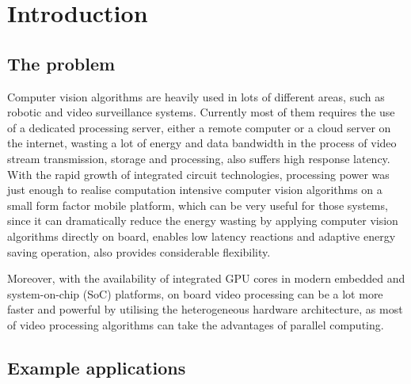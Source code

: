 \chapter{Introduction} \label{Chapter:Introduction}

\iffalse
1-1.5 pages
\fi

\section{The problem}

\iffalse
\fi

Computer vision algorithms are heavily used in lots of different areas, such as robotic and video surveillance systems. Currently most of them requires the use of a dedicated processing server, either a remote computer or a cloud server on the internet, wasting a lot of energy and data bandwidth in the process of video stream transmission, storage and processing, also suffers high response latency. With the rapid growth of integrated circuit technologies, processing power was just enough to realise computation intensive computer vision algorithms on a small form factor mobile platform, which can be very useful for those systems, since it can dramatically reduce the energy wasting by applying computer vision algorithms directly on board, enables low latency reactions and adaptive energy saving operation, also provides considerable flexibility.

Moreover, with the availability of integrated GPU cores in modern embedded and system-on-chip (SoC) platforms, on board video processing can be a lot more faster and powerful by utilising the heterogeneous hardware architecture, as most of video processing algorithms can take the advantages of parallel computing.


\section{Example applications} %

\iffalse
Example applications, can be multiple.
e.g. Video conference.
\fi

